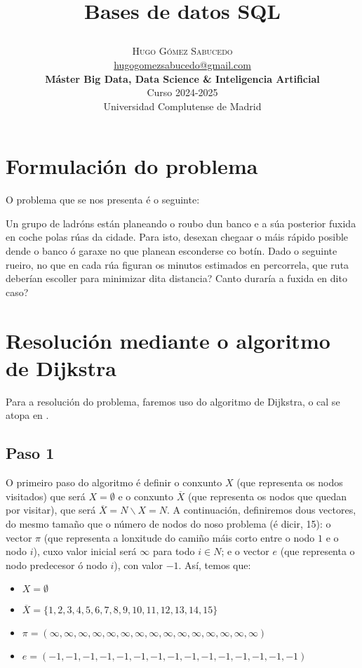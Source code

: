 \documentclass[a4paper,onecolumn]{article}
\title{\begin{center} \Huge Bases de datos SQL \end{center}} %
\author{
	\textsc{\LARGE Hugo Gómez Sabucedo} \\ %
	\large \href{mailto:hugogomezsabucedo@gmail.com}{hugogomezsabucedo@gmail.com} \\ [2ex] %
	\large \textbf{Máster Big Data, Data Science & Inteligencia Artificial} \\
        \normalsize Curso 2024-2025 \\
        \small Universidad Complutense de Madrid
}
\date{} %
\let\stdsection\section
\renewcommand\section{\newpage\stdsection}
\begin{document}
\maketitle
\tableofcontents


\section{Formulación do problema} \label{formulacion}
O problema que se nos presenta é o seguinte:

Un grupo de ladróns están planeando o roubo dun banco e a súa posterior fuxida en coche polas rúas da cidade. Para isto, desexan chegaar o máis rápido posible dende o banco ó garaxe no que planean esconderse co botín. Dado o seguinte rueiro, no que en cada rúa figuran os minutos estimados en percorrela, que ruta deberían escoller para minimizar dita distancia? Canto duraría a fuxida en dito caso?

\begin{figure}[h]
\centering
\end{figure}

\section{Resolución mediante o algoritmo de Dijkstra}\label{algoritmo}
Para a resolución do problema, faremos uso do algoritmo de Dijkstra, o cal se atopa en \cite[páx.142]{Libro}.

\subsection{Paso 1}\label{paso1}
O primeiro paso do algoritmo é definir o conxunto $X$ (que representa os nodos visitados) que será $X=\emptyset$ e o conxunto $\overline{X}$ (que representa os nodos que quedan por visitar), que será $\overline{X}=N\backslash X=N$. A continuación, definiremos dous vectores, do mesmo tamaño que o número de nodos do noso problema (é dicir, 15): o vector $\pi$ (que representa a lonxitude do camiño máis corto entre o nodo $1$ e o nodo $i$), cuxo valor inicial será $\infty$ para todo $i \in N$; e o vector $e$ (que representa o nodo predecesor ó nodo $i$), con valor $-1$. Así, temos que:
\begin{itemize}
    \item $X=\emptyset$
    \item $\overline{X}=\{1, 2, 3, 4, 5, 6, 7, 8, 9, 10, 11, 12, 13, 14, 15\}$
    \item $\pi = (\infty, \infty, \infty, \infty, \infty, \infty, \infty, \infty, \infty, \infty, \infty, \infty, \infty, \infty, \infty )$
    \item $e = (-1, -1, -1, -1, -1, -1, -1, -1, -1, -1, -1, -1, -1, -1, -1 )$
\end{itemize}
\end{document}
